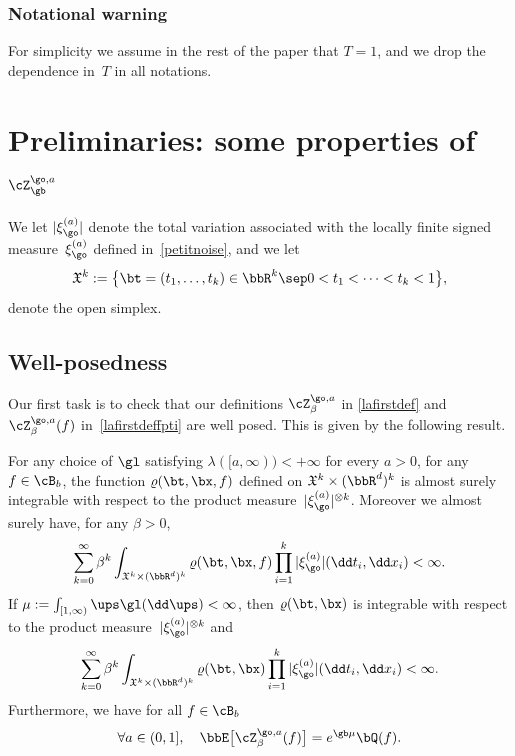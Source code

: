 \subsubsection*{Notational warning}
For simplicity we assume in the rest of the paper that $T=1$, and we drop the dependence in~$T$ in all notations.

\section{Preliminaries: some properties of \texorpdfstring{$\cZ_{\gb}^{\go,a}$}{Z}}
\label{sec:conti}

We let $|\xi_{\go}^{(a)}|$ denote the total variation associated with the locally finite signed measure~$\xi_{\go}^{(a)}$ defined in~\eqref{petitnoise},
and we let\vspace*{-3pt}
\[
\mathfrak{X}^k:=\bigl\{ \bt = (t_1, \ldots, t_k) \in \bbR^k \sep 0<t_1<\dots<t_k<1 \bigr\},
\]
denote the open simplex.

\subsection{Well-posedness}

Our first task is to check that our definitions $\cZ^{\go,a}_{\beta}$ in \eqref{lafirstdef} and $\cZ^{\go,a}_{\beta}(f)$ in~\eqref{lafirstdeffpti} are well posed. This is given by the following result.
\begin{proposition}
\label{prop:contiZfini}
For any choice of $\gl$ satisfying $\lambda([a,\infty)) <+\infty$ for every $a>0$,
for any~$f\in \cB_b$,
the function
$\varrho(\bt,\bx,f)$ defined on $\mathfrak{X}^k\times (\bbR^d)^k$
is almost surely integrable with respect to the product measure~$|\xi_{\go}^{(a)}|^{\otimes k}$.
Moreover we almost surely have, for any $\beta>0$,
\begin{equation}\label{finitesum2}
\sum_{k=0}^\infty \beta^k\int_{\mathfrak{X}^k \times (\bbR^d)^k} \varrho(\bt,\bx,f) \prod_{i=1}^k |\xi_{\go}^{(a)}|(\dd t_i,\dd x_i)<\infty.
\end{equation}
If $\mu:=\int_{[1,\infty)} \ups \gl(\dd \ups) <\infty$, then $\varrho(\bt,\bx)$ is integrable with respect to the product measure~$|\xi_{\go}^{(a)}|^{\otimes k}$ and
\begin{equation}\label{finitesum}
\sum_{k=0}^\infty \beta^k\int_{\mathfrak{X}^k \times (\bbR^d)^k} \varrho(\bt,\bx) \prod_{i=1}^k |\xi_{\go}^{(a)}|(\dd t_i,\dd x_i)<\infty.
\end{equation}
Furthermore, we have for all $f\in \cB_b$
\begin{equation}\label{lamine}
\forall a\in (0,1], \quad \bbE \bigl[ \cZ^{\go,a}_{\beta}(f) \bigr] = e^{\gb \mu} \bQ(f).
\end{equation}
\end{proposition}

